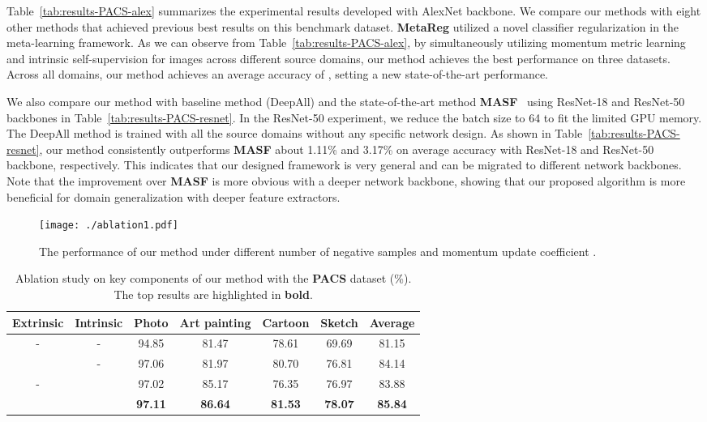 Table~\ref{tab:results-PACS-alex} summarizes the experimental results developed with AlexNet backbone.
We compare our methods with eight other methods that achieved previous best results on this benchmark dataset.
\textbf{MetaReg} \cite{balaji2018metareg} utilized a novel classifier regularization in the meta-learning framework.
As we can observe from Table~\ref{tab:results-PACS-alex}, by simultaneously utilizing momentum metric learning and intrinsic self-supervision for images across different source domains, our method achieves the best performance on three datasets. 
Across all domains, our method achieves an average accuracy of , setting a new state-of-the-art performance.

We also compare our method with baseline method (DeepAll) and the state-of-the-art method \textbf{MASF}~\cite{dou2019domain} using ResNet-18 and ResNet-50 backbones in  Table~\ref{tab:results-PACS-resnet}. 
In the ResNet-50 experiment, we reduce the batch size to 64 to fit the limited GPU memory.
The DeepAll method is trained with all the source domains without any specific network design.
As shown in Table~\ref{tab:results-PACS-resnet}, our method consistently outperforms \textbf{MASF} about 1.11\% and 3.17\% on average accuracy with ResNet-18 and ResNet-50 backbone, respectively.
This indicates that our designed framework is very general and can be migrated to different network backbones.
Note that the improvement over \textbf{MASF} is more obvious with a deeper network backbone, showing that our proposed algorithm is more beneficial for domain generalization with deeper feature extractors.

\begin{figure}[!t]
	\centering
	\texttt{[image: ./ablation1.pdf]}
	\caption{
		The performance of our method under different number of negative samples  and momentum update coefficient . 
}
	\label{fig:ablation1}
\end{figure}
\begin{table*} [!t]
	\centering
	\caption{Ablation study on key components of our method with the \textbf{PACS} dataset (\%). 
		The top results are highlighted in \textbf{bold}.}
	\label{tab:results-PACS-ablation}
{
		\setlength\tabcolsep{1.5pt}
		\begin{tabular}{cc|cccc|c}
			\toprule[1pt]
			\textbf{Extrinsic} & \textbf{Intrinsic}  & \textbf{P}hoto  & \textbf{A}rt painting &  \textbf{C}artoon &\textbf{S}ketch & \textbf{Average} \\
			\hline
			\T
			-&-&94.85&81.47&78.61&69.69& 81.15\\
			\checkmark &-&97.06&81.97&80.70&76.81&84.14 \\
			- &\checkmark&97.02&85.17&76.35&76.97&83.88 \\
			\checkmark     &\checkmark&\textbf{97.11}&\textbf{86.64}&\textbf{81.53}&\textbf{78.07}&\textbf{85.84} \\
			
			\toprule[1pt]
		\end{tabular}
	}
\end{table*}


